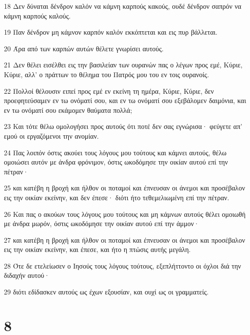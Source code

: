 \par 18 Δεν δύναται δένδρον καλόν να κάμνη καρπούς κακούς, ουδέ δένδρον σαπρόν να κάμνη καρπούς καλούς.
\par 19 Παν δένδρον μη κάμνον καρπόν καλόν εκκόπτεται και εις πυρ βάλλεται.
\par 20 Άρα από των καρπών αυτών θέλετε γνωρίσει αυτούς.
\par 21 Δεν θέλει εισέλθει εις την βασιλείαν των ουρανών πας ο λέγων προς εμέ, Κύριε, Κύριε, αλλ' ο πράττων το θέλημα του Πατρός μου του εν τοις ουρανοίς.
\par 22 Πολλοί θέλουσιν ειπεί προς εμέ εν εκείνη τη ημέρα, Κύριε, Κύριε, δεν προεφητεύσαμεν εν τω ονόματί σου, και εν τω ονόματί σου εξεβάλομεν δαιμόνια, και εν τω ονόματί σου εκάμομεν θαύματα πολλά;
\par 23 Και τότε θέλω ομολογήσει προς αυτούς ότι ποτέ δεν σας εγνώρισα· φεύγετε απ' εμού οι εργαζόμενοι την ανομίαν.
\par 24 Πας λοιπόν όστις ακούει τους λόγους μου τούτους και κάμνει αυτούς, θέλω ομοιώσει αυτόν με άνδρα φρόνιμον, όστις ωκοδόμησε την οικίαν αυτού επί την πέτραν·
\par 25 και κατέβη η βροχή και ήλθον οι ποταμοί και έπνευσαν οι άνεμοι και προσέβαλον εις την οικίαν εκείνην, και δεν έπεσε· διότι ήτο τεθεμελιωμένη επί την πέτραν.
\par 26 Και πας ο ακούων τους λόγους μου τούτους και μη κάμνων αυτούς θέλει ομοιωθή με άνδρα μωρόν, όστις ωκοδόμησε την οικίαν αυτού επί την άμμον·
\par 27 και κατέβη η βροχή και ήλθον οι ποταμοί και έπνευσαν οι άνεμοι και προσέβαλον εις την οικίαν εκείνην, και έπεσε, και ήτο η πτώσις αυτής μεγάλη.
\par 28 Ότε δε ετελείωσεν ο Ιησούς τους λόγους τούτους, εξεπλήττοντο οι όχλοι διά την διδαχήν αυτού·
\par 29 διότι εδίδασκεν αυτούς ως έχων εξουσίαν, και ουχί ως οι γραμματείς.

\chapter{8}

